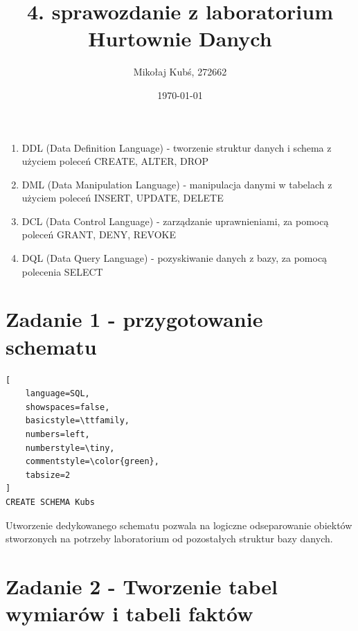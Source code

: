 \documentclass[a4paper,12pt]{article}
\title{4. sprawozdanie z laboratorium Hurtownie Danych}
\author{Mikołaj Kubś, 272662}
\date{\today}
\begin{document}
\maketitle

\begin{enumerate}
  \item DDL (Data Definition Language) - tworzenie struktur danych i schema z użyciem poleceń CREATE, ALTER, DROP
  \item DML (Data Manipulation Language) - manipulacja danymi w tabelach z użyciem poleceń INSERT, UPDATE, DELETE
  \item DCL (Data Control Language) - zarządzanie uprawnieniami, za pomocą poleceń GRANT, DENY, REVOKE
  \item DQL (Data Query Language) - pozyskiwanie danych z bazy, za pomocą polecenia SELECT
\end{enumerate}

\section{Zadanie 1 - przygotowanie schematu}

 {\small
  \begin{lstlisting}[
	language=SQL,
	showspaces=false,
	basicstyle=\ttfamily,
	numbers=left,
	numberstyle=\tiny,
	commentstyle=\color{green},
	tabsize=2
]
CREATE SCHEMA Kubs
\end{lstlisting}}

Utworzenie dedykowanego schematu pozwala na logiczne odseparowanie obiektów stworzonych na potrzeby laboratorium od pozostałych struktur bazy danych.

\section{Zadanie 2 - Tworzenie tabel wymiarów i tabeli faktów}
\end{document}
